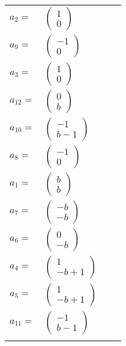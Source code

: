 \documentclass[1p]{elsarticle_modified}
\theoremstyle{definition}
\begin{document}
\begin{tabular}{m{7pt} m{180pt} m{7pt} m{180pt} }
\flushright $a_{2}=$&$\begin{pmatrix}1\\0\end{pmatrix}$ \\
\flushright $a_{9}=$&$\begin{pmatrix}-1\\0\end{pmatrix}$ \\
\flushright $a_{3}=$&$\begin{pmatrix}1\\0\end{pmatrix}$ \\
\flushright $a_{12}=$&$\begin{pmatrix}0\\b\end{pmatrix}$ \\
\flushright $a_{10}=$&$\begin{pmatrix}-1\\b-1\end{pmatrix}$ \\
\flushright $a_{8}=$&$\begin{pmatrix}-1\\0\end{pmatrix}$ \\
\flushright $a_{1}=$&$\begin{pmatrix}b\\b\end{pmatrix}$ \\
\flushright $a_{7}=$&$\begin{pmatrix}- b\\- b\end{pmatrix}$ \\
\flushright $a_{6}=$&$\begin{pmatrix}0\\- b\end{pmatrix}$ \\
\flushright $a_{4}=$&$\begin{pmatrix}1\\- b+1\end{pmatrix}$ \\
\flushright $a_{5}=$&$\begin{pmatrix}1\\- b+1\end{pmatrix}$ \\
\flushright $a_{11}=$&$\begin{pmatrix}-1\\b-1\end{pmatrix}$\\&\end{tabular}
\end{document}
